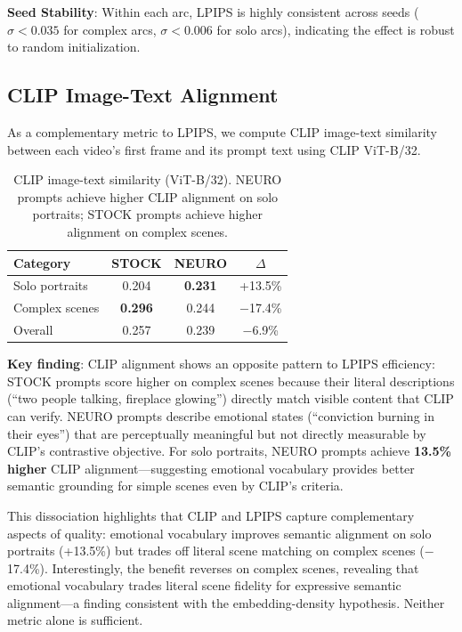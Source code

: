 \documentclass[10pt,twocolumn,letterpaper]{article}
\begin{document}
\textbf{Seed Stability}: Within each arc, LPIPS is highly consistent across seeds ($\sigma < 0.035$ for complex arcs, $\sigma < 0.006$ for solo arcs), indicating the effect is robust to random initialization.

\subsection{CLIP Image-Text Alignment}

As a complementary metric to LPIPS, we compute CLIP image-text similarity \cite{radford2021} between each video's first frame and its prompt text using CLIP ViT-B/32.

\begin{table}[t]
\centering
\small
\begin{tabular}{lccc}
\toprule
\textbf{Category} & \textbf{STOCK} & \textbf{NEURO} & \textbf{$\Delta$} \\
\midrule
Solo portraits & 0.204 & \textbf{0.231} & +13.5\% \\
Complex scenes & \textbf{0.296} & 0.244 & $-$17.4\% \\
\midrule
Overall & 0.257 & 0.239 & $-$6.9\% \\
\bottomrule
\end{tabular}
\caption{CLIP image-text similarity (ViT-B/32). NEURO prompts achieve higher CLIP alignment on solo portraits; STOCK prompts achieve higher alignment on complex scenes.}
\label{tab:clip}
\end{table}

\textbf{Key finding}: CLIP alignment shows an opposite pattern to LPIPS efficiency: STOCK prompts score higher on complex scenes because their literal descriptions (``two people talking, fireplace glowing'') directly match visible content that CLIP can verify. NEURO prompts describe emotional states (``conviction burning in their eyes'') that are perceptually meaningful but not directly measurable by CLIP's contrastive objective. For solo portraits, NEURO prompts achieve \textbf{13.5\% higher} CLIP alignment---suggesting emotional vocabulary provides better semantic grounding for simple scenes even by CLIP's criteria.

This dissociation highlights that CLIP and LPIPS capture complementary aspects of quality: emotional vocabulary improves semantic alignment on solo portraits (+13.5\%) but trades off literal scene matching on complex scenes ($-$17.4\%). Interestingly, the benefit reverses on complex scenes, revealing that emotional vocabulary trades literal scene fidelity for expressive semantic alignment---a finding consistent with the embedding-density hypothesis. Neither metric alone is sufficient.
\end{document}

